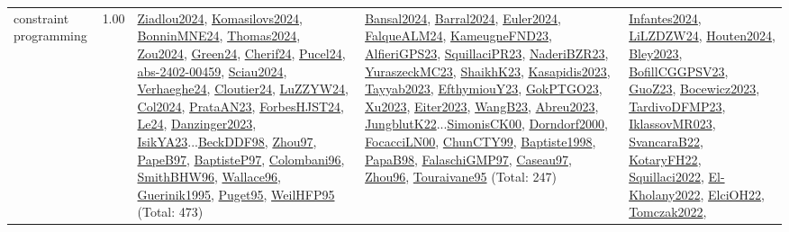 {\begin{longtable}{p{3cm}r>{\raggedright\arraybackslash}p{6cm}>{\raggedright\arraybackslash}p{6cm}>{\raggedright\arraybackslash}p{8cm}}
\index{constraint programming}\index{CP!constraint programming}constraint programming &  1.00 & \hyperref[detail:Ziadlou2024]{Ziadlou2024}, \hyperref[detail:Komasilovs2024]{Komasilovs2024}, \hyperref[detail:BonninMNE24]{BonninMNE24}, \hyperref[detail:Thomas2024]{Thomas2024}, \hyperref[detail:Zou2024]{Zou2024}, \hyperref[detail:Green24]{Green24}, \hyperref[detail:Cherif24]{Cherif24}, \hyperref[detail:Pucel24]{Pucel24}, \hyperref[detail:abs-2402-00459]{abs-2402-00459}, \hyperref[detail:Sciau2024]{Sciau2024}, \hyperref[detail:Verhaeghe24]{Verhaeghe24}, \hyperref[detail:Cloutier24]{Cloutier24}, \hyperref[detail:LuZZYW24]{LuZZYW24}, \hyperref[detail:Col2024]{Col2024}, \hyperref[detail:PrataAN23]{PrataAN23}, \hyperref[detail:ForbesHJST24]{ForbesHJST24}, \hyperref[detail:Le24]{Le24}, \hyperref[detail:Danzinger2023]{Danzinger2023}, \hyperref[detail:IsikYA23]{IsikYA23}...\hyperref[detail:BeckDDF98]{BeckDDF98}, \hyperref[detail:Zhou97]{Zhou97}, \hyperref[detail:PapeB97]{PapeB97}, \hyperref[detail:BaptisteP97]{BaptisteP97}, \hyperref[detail:Colombani96]{Colombani96}, \hyperref[detail:SmithBHW96]{SmithBHW96}, \hyperref[detail:Wallace96]{Wallace96}, \hyperref[detail:Guerinik1995]{Guerinik1995}, \hyperref[detail:Puget95]{Puget95}, \hyperref[detail:WeilHFP95]{WeilHFP95} (Total: 473) & \hyperref[detail:Bansal2024]{Bansal2024}, \hyperref[detail:Barral2024]{Barral2024}, \hyperref[detail:Euler2024]{Euler2024}, \hyperref[detail:FalqueALM24]{FalqueALM24}, \hyperref[detail:KameugneFND23]{KameugneFND23}, \hyperref[detail:AlfieriGPS23]{AlfieriGPS23}, \hyperref[detail:SquillaciPR23]{SquillaciPR23}, \hyperref[detail:NaderiBZR23]{NaderiBZR23}, \hyperref[detail:YuraszeckMC23]{YuraszeckMC23}, \hyperref[detail:ShaikhK23]{ShaikhK23}, \hyperref[detail:Kasapidis2023]{Kasapidis2023}, \hyperref[detail:Tayyab2023]{Tayyab2023}, \hyperref[detail:EfthymiouY23]{EfthymiouY23}, \hyperref[detail:GokPTGO23]{GokPTGO23}, \hyperref[detail:Xu2023]{Xu2023}, \hyperref[detail:Eiter2023]{Eiter2023}, \hyperref[detail:WangB23]{WangB23}, \hyperref[detail:Abreu2023]{Abreu2023}, \hyperref[detail:JungblutK22]{JungblutK22}...\hyperref[detail:SimonisCK00]{SimonisCK00}, \hyperref[detail:Dorndorf2000]{Dorndorf2000}, \hyperref[detail:FocacciLN00]{FocacciLN00}, \hyperref[detail:ChunCTY99]{ChunCTY99}, \hyperref[detail:Baptiste1998]{Baptiste1998}, \hyperref[detail:PapaB98]{PapaB98}, \hyperref[detail:FalaschiGMP97]{FalaschiGMP97}, \hyperref[detail:Caseau97]{Caseau97}, \hyperref[detail:Zhou96]{Zhou96}, \hyperref[detail:Touraivane95]{Touraivane95} (Total: 247) & \hyperref[detail:Infantes2024]{Infantes2024}, \hyperref[detail:LiLZDZW24]{LiLZDZW24}, \hyperref[detail:Houten2024]{Houten2024}, \hyperref[detail:Bley2023]{Bley2023}, \hyperref[detail:BofillCGGPSV23]{BofillCGGPSV23}, \hyperref[detail:GuoZ23]{GuoZ23}, \hyperref[detail:Bocewicz2023]{Bocewicz2023}, \hyperref[detail:TardivoDFMP23]{TardivoDFMP23}, \hyperref[detail:IklassovMR023]{IklassovMR023}, \hyperref[detail:SvancaraB22]{SvancaraB22}, \hyperref[detail:KotaryFH22]{KotaryFH22}, \hyperref[detail:Squillaci2022]{Squillaci2022}, \hyperref[detail:El-Kholany2022]{El-Kholany2022}, \hyperref[detail:ElciOH22]{ElciOH22}, \hyperref[detail:Tomczak2022]{Tomczak2022}, 
\end{longtable}}
